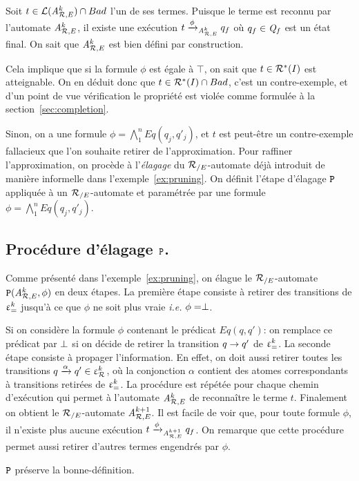 Soit $t \in \mathcal{L}({\mathit A}_{\mathcal R,E}^k) \cap Bad$ l'un de ses termes. 
Puisque le terme est reconnu par l'automate ${\mathit A}_{\mathcal R,E}^k$, il existe
une exécution $t \xrightarrow{\phi}_{{\mathit A}_{\mathcal R,E}^k} q_f$ où $q_f \in \mathit Q_f$ est un état final.
On sait que ${\mathit A}_{\mathcal R,E}^k$ est bien défini par construction.

Cela implique que si la formule $\phi$ est égale à $\top$, on sait que $t \in \mathcal R^*(I)$ est atteignable.
On en déduit donc que $t \in \mathcal R^*(I) \cap Bad$, c'est un contre-exemple, et d'un point de vue
vérification le propriété est violée comme formulée à la section~\ref{sec:completion}.

Sinon, on a une formule $\phi = \bigwedge_1^n Eq(q_j, q'_j)$, et $t$ est peut-être un contre-exemple 
fallacieux que l'on souhaite retirer de l'approximation.
Pour raffiner l'approximation, on procède à l'\emph{élagage} du ${\mathcal R_{/E}}$-automate
déjà introduit de manière informelle dans l'exemple~\ref{ex:pruning}. On définit
l'étape d'élagage $\mathtt{P}$ appliquée à un ${\mathcal R_{/E}}$-automate et paramétrée par 
une formule $\phi = \bigwedge_1^n Eq(q_j, q'_j)$.



\subsection{Procédure d'élagage $\mathtt{P}$.}
\label{subsec:refinementstep}
Comme présenté dans l'exemple~\ref{ex:pruning}, on élague le
${\mathcal R_{/E}}$-automate $\mathtt{P}({\mathit A}_{\mathcal R,E}^k, \phi)$ en deux étapes. La première étape
consiste à retirer des transitions de $\upvarepsilon_{=}^k$ jusqu'à ce que $\phi$
ne soit plus vraie {\em i.e.} $\phi = \perp$.

Si on considère la formule $\phi$ contenant le prédicat $Eq(q,q')$: on
remplace ce prédicat par $\perp$ si on décide de retirer la
transition $q \rightarrow q'$ de $\upvarepsilon_{=}^k$. La seconde étape consiste à
propager l'information.  En effet, on doit aussi retirer toutes les
transitions $q \xrightarrow{\alpha} q' \in \upvarepsilon_{\mathcal R}^k$, où la conjonction $\alpha$
contient des atomes correspondants à transitions retirées de $\upvarepsilon_{=}^k$.
La procédure est répétée pour chaque chemin d'exécution qui permet à
l'automate ${\mathit A}_{\mathcal R,E}^k$ de reconnaître le terme $t$. Finalement on
obtient le ${\mathcal R_{/E}}$-automate ${\mathit A}_{\mathcal R,E}^{k+1}$.  Il est facile de voir que,
pour toute formule $\phi$, il n'existe plus aucune exécution $t
\xrightarrow{\phi}_{{\mathit A}_{\mathcal R,E}^{k+1}} q_f$.  On remarque que cette procédure
permet aussi retirer d'autres termes engendrés par $\phi$.

\begin{property}
   $\mathtt{P}$ préserve la bonne-définition.
\end{property}

